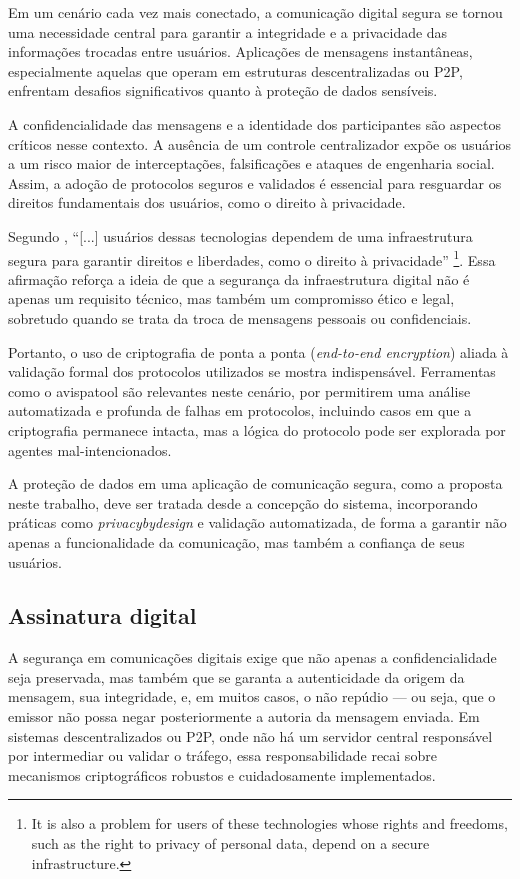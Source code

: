 Em um cenário cada vez mais conectado, a comunicação digital segura
se tornou uma necessidade central para garantir a integridade e a
privacidade das informações trocadas entre usuários. Aplicações de
mensagens instantâneas, especialmente aquelas que operam em
estruturas descentralizadas ou \acs{P2P}, enfrentam
desafios significativos quanto à proteção de dados sensíveis.

A confidencialidade das mensagens e a identidade dos participantes
são aspectos críticos nesse contexto. A ausência de um controle
centralizador expõe os usuários a um risco maior de interceptações,
falsificações e ataques de engenharia social. Assim, a adoção de
protocolos seguros e validados é essencial para resguardar os
direitos fundamentais dos usuários, como o direito à privacidade.

Segundo , “[...]
usuários dessas tecnologias dependem de uma infraestrutura segura
para garantir direitos e liberdades, como o direito à privacidade”
\footnote{It is also a problem for users of these technologies whose
  rights and freedoms, such as the right to privacy of personal data,
depend on a secure infrastructure.}. Essa afirmação reforça a ideia
de que a segurança da infraestrutura digital não é apenas um
requisito técnico, mas também um compromisso ético e legal, sobretudo
quando se trata da troca de mensagens pessoais ou confidenciais.

Portanto, o uso de criptografia de ponta a ponta (\textit{end-to-end
encryption}) aliada à validação formal dos protocolos utilizados se
mostra indispensável. Ferramentas como o \gls{avispatool} são
relevantes neste cenário, por permitirem uma análise automatizada e
profunda de falhas em protocolos, incluindo casos em que a
criptografia permanece intacta, mas a lógica do protocolo pode ser
explorada por agentes mal-intencionados.

A proteção de dados em uma aplicação de comunicação segura, como a
proposta neste trabalho, deve ser tratada desde a concepção do
sistema, incorporando práticas como \textit{\gls{privacybydesign}} e
validação automatizada, de forma a garantir não apenas a
funcionalidade da comunicação, mas também a confiança de seus usuários.

\subsection{Assinatura digital}

A segurança em comunicações digitais exige que não apenas a
confidencialidade seja preservada, mas também que se garanta a
autenticidade da origem da mensagem, sua integridade, e, em
muitos casos, o não repúdio — ou seja, que o emissor não possa
negar posteriormente a autoria da mensagem enviada. Em sistemas
descentralizados ou \acs{P2P}, onde não há um servidor
central responsável por intermediar ou validar o tráfego, essa
responsabilidade recai sobre mecanismos criptográficos robustos e
cuidadosamente implementados.

